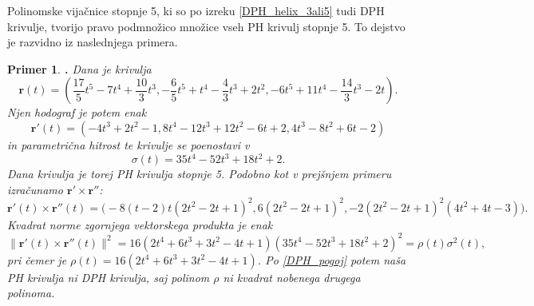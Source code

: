 \documentclass[12pt,a4paper,twoside]{article}
\theoremstyle{definition} %
\theoremstyle{plain} %
\theoremstyle{primerstyle}
\newtheorem{primer}[definicija]{Primer}
\numberwithin{equation}{section}  %
\newcommand{\rV}{\mathbf{r}}
\DeclareMathOperator{\st}{st}
\begin{document}
Polinomske vijačnice stopnje 5, ki so po izreku \ref{DPH_helix_3ali5} tudi DPH krivulje, tvorijo pravo podmnožico množice vseh PH krivulj stopnje 5. To dejstvo je razvidno iz naslednjega primera.
\begin{primer}
	\textbf{.} Dana je krivulja $$\rV(t)=(\frac{17}{5}t^5-7t^4+\frac{10}{3}t^3,-\frac{6}{5}t^5+t^4-\frac{4}{3}t^3+2t^2,-6t^5+11t^4-\frac{14}{3}t^3-2t).$$ Njen hodograf je potem enak $$\rV'(t)=(-4t^3+2t^2-1,8t^4-12t^3+12t^2-6t+2,4t^3-8t^2+6t-2)$$ in parametrična hitrost te krivulje se poenostavi v
	$$\sigma(t)=35t^4-52t^3+18t^2+2.$$
	Dana krivulja je torej PH krivulja stopnje 5. Podobno kot v prejšnjem primeru izračunamo $\rV'\times\rV''$:
	$$\rV'(t)\times\rV''(t)=\big(-8(t-2)t(2t^2-2t+1)^2,6(2t^2-2t+1)^2,-2(2t^2-2t+1)^2 (4t^2+4t-3)\big).$$
	Kvadrat norme zgornjega vektorskega produkta je enak
	$$\lVert\rV'(t)\times\rV''(t)\rVert^2=16(2t^4+6t^3+3t^2-4t+1)(35t^4-52t^3+18t^2+2)^2=\rho(t)\sigma^2(t),$$
	pri čemer je $\rho(t)=16(2t^4+6t^3+3t^2-4t+1)$. Po \eqref{DPH_pogoj} potem naša PH krivulja ni DPH krivulja, saj polinom $\rho$ ni kvadrat nobenega drugega polinoma.
\end{primer}
\end{document}
